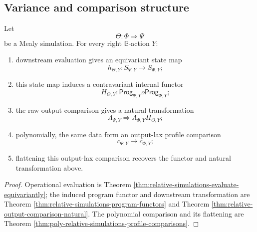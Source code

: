 \subsection{Variance and comparison structure}
\label{subsec:relative-response-variance-summary}

\begin{theorem}
\label{thm:relative-response-simulation-summary}
Let
\[
    \Theta:\Phi\Rightarrow\Psi
\]
be a Mealy simulation.  For every right \(\mathbb B\)-action \(Y\):
\begin{enumerate}
    \item downstream evaluation gives an equivariant state map
    \[
        h_{\Theta,Y}:S_{\Psi,Y}\to S_{\Phi,Y};
    \]

    \item this state map induces a contravariant internal functor
    \[
        H_{\Theta,Y}:
        \mathsf{Prog}_{\Psi,Y}	o\mathsf{Prog}_{\Phi,Y};
    \]

    \item the raw output comparison gives a natural transformation
    \[
        \Lambda_{\Psi,Y}
        \Rightarrow
        \Lambda_{\Phi,Y}H_{\Theta,Y};
    \]

    \item polynomially, the same data form an output-lax profile comparison
    \[
        c_{\Psi,Y}\longrightarrow c_{\Phi,Y};
    \]

    \item flattening this output-lax comparison recovers the functor and
    natural transformation above.
\end{enumerate}
\end{theorem}

\begin{proof}
Operational evaluation is Theorem
\ref{thm:relative-simulations-evaluate-equivariantly}; the induced program
functor and downstream transformation are Theorem
\ref{thm:relative-simulations-program-functors} and Theorem
\ref{thm:relative-output-comparison-natural}.  The polynomial comparison and
its flattening are Theorem
\ref{thm:poly-relative-simulations-profile-comparisons}.
\end{proof}

